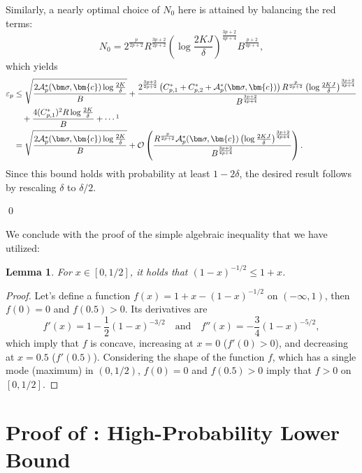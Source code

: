 \documentclass{article}
\def\vc{{\bm{c}}}
\def\gA{{\mathcal{A}}}
\def\gO{{\mathcal{O}}}
\theoremstyle{plain}
\newtheorem{lemma}[theorem]{Lemma}
\theoremstyle{definition}
\theoremstyle{plain}
\begin{document}
Similarly, a nearly optimal choice of $N_0$ here is attained by balancing the {\color{red}red} terms:
\begin{equation}
    N_0 = 2^{\frac{p}{2p+2}} R^{\frac{3p+2}{2p+2}} \left( \log\frac{2KJ}{\delta} \right)^{\frac{3p+2}{4p+4}} B^{\frac{p+2}{4p+4}},
\end{equation}
which yields
\begin{align}
    \varepsilon_p &\leq \sqrt{\frac{2 \gA_p^*(\bm\sigma, \vc) \log\frac{2K}{\delta}}{B}} + \frac{2^{\frac{3p+2}{2p+2}} \left(C_{p,1}^* + C_{p,2}^* + \gA_p^*(\bm\sigma, \vc) \right) R^{\frac{p}{2p+2}} \left( \log\frac{2KJ}{\delta} \right)^{\frac{3p+2}{4p+4}}}{B^{\frac{3p+2}{4p+4}}} \\
    &\quad + \frac{4 (C_{p,1}^*)^2 R \log\frac{2K}{\delta}}{B} + \cdots\footnotemark\\
    & = \sqrt{\frac{2 \gA_p^*(\bm\sigma, \vc) \log\frac{2K}{\delta}}{B}} + \gO\left( \frac{R^{\frac{p}{2p+2}} \gA_p^*(\bm\sigma, \vc) \left(\log \frac{2KJ}{\delta}\right)^{\frac{3p+2}{4p+4}}}{B^{\frac{3p+2}{4p+4}}}\right).
\end{align}
Since this bound holds with probability at least $1- 2\delta$, the desired result follows by rescaling $\delta$ to $\delta/2$.

\qed


We conclude with the proof of the simple algebraic inequality that we have utilized:
\begin{lemma}\label{lem:algebraic-inequality}
    For $x \in [0, 1/2]$, it holds that $(1-x)^{-1/2} \leq 1 + x$.
\end{lemma}
\begin{proof}
Let's define a function $f(x) = 1+x - (1-x)^{-1/2}$ on $(-\infty, 1)$, then $f(0)=0$ and $f(0.5)>0$.
Its derivatives are 
\begin{equation}
    f'(x) = 1 - \frac{1}{2}(1-x)^{-3/2} \quad \text{and} \quad f''(x) = -\frac{3}{4} (1-x)^{-5/2},
\end{equation}
which imply that $f$ is concave, increasing at $x=0$ ($f'(0)>0$), and decreasing at $x=0.5$ ($f'(0.5)$).
Considering the shape of the function $f$, which has a single mode (maximum) in $(0, 1/2)$, $f(0) = 0$ and $f(0.5)>0$ imply that $f >0$ on $[0, 1/2]$.
\end{proof}

\newpage
\section{\texorpdfstring{Proof of : High-Probability Lower Bound}{Proof of Theorem 5.1: High-Probability Lower Bound}}
\label{app:whp-lower-bound}
\end{document}

